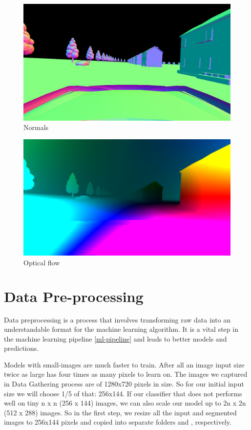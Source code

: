 \begin{figure}[H]
  \centering
  \includegraphics[width=\textwidth]{images/Chapter3/_normals.jpg}
  \caption{Normals}
  \label{fig:normals}
\end{figure}
\begin{figure}[H]
  \centering
  \includegraphics[width=\textwidth]{images/Chapter3/_flow.jpg}
  \caption{Optical flow}
  \label{fig:flow}
\end{figure}

\section{Data Pre-processing}

Data preprocessing is a process that involves transforming raw data into an understandable format for the machine learning algorithm. It is a vital step in the machine learning pipeline \ref{ml-pipeline} and leads to better models and predictions.

Models with small-images are much faster to train. After all an image input size twice as large has four times as many pixels to learn on. The images we captured in Data Gathering process are of 1280x720 pixels in size. So for our initial input size we will choose 1/5 of that: 256x144. If our classifier that does not performs well on tiny n x n (256 x 144) images, we can also scale our model up to 2n x 2n (512 x 288) images. So in the first step, we resize all the input and segmented images to 256x144 pixels and copied into separate folders  and , respectively.

